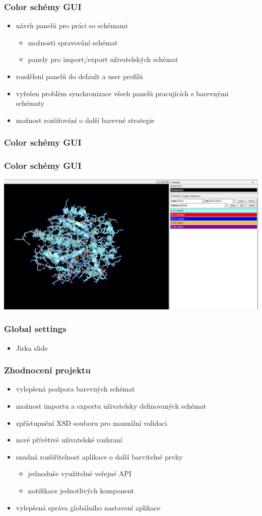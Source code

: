 \documentclass[slovak]{beamer}
\begin{document}
\begin{frame}
\frametitle{Color schémy GUI}
	\begin{itemize}
		\item návrh panelů pro práci so schémami
		\begin{itemize}
			\item možnosti spravování schémat
			\item panely pro import/export uživatelských schémat
		\end{itemize}
		\item rozdělení panelů do default a user profilů
		\item vyřešen problém synchronizace všech panelů pracujících s barevnými schématy
		\item možnost rozšiřování o další barevné strategie
	\end{itemize}
\end{frame}

\begin{frame}
\frametitle{Color schémy GUI}
	\frametitle{Color schémy GUI}
	\includegraphics[width=\linewidth]{colorpanel.jpg}
\end{frame}

\begin{frame}
\frametitle{Global settings}
	\begin{itemize}
		\item Jirka slide
	\end{itemize}
\end{frame}

\begin{frame}
\frametitle{Zhodnocení projektu}
	\begin{itemize}
		\item vylepšená podpora barevných schémat
		\item možnost importu a exportu uživatelsky definovaných schémat
		\item zpřístupnění XSD souboru pro manuální validaci
		\item nové přívětivé uživatelské rozhraní
		\item snadná rozšiřitelnost aplikace o další barvitelné prvky
		\begin{itemize}
			\item jednoduše využitelné veřejné API
			\item notifikace jednotlivých komponent
		\end{itemize}
		\item vylepšená správa globálního nastavení aplikace 
	\end{itemize}
\end{frame}
\end{document}

